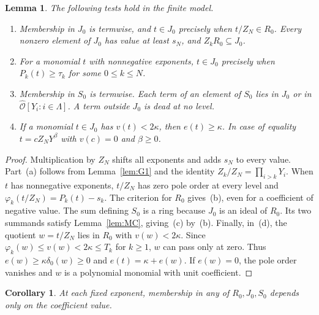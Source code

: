 \documentclass[11pt, letterpaper]{article}
\newtheorem{lemma}[theorem]{Lemma}
\newtheorem{corollary}[theorem]{Corollary}
\theoremstyle{definition}
\theoremstyle{remark}
\begin{document}
\begin{lemma}
    \label{lem:G2}
    The following tests hold in the finite model.
    \begin{enumerate}
        \item[\textup{(a)}] Membership in $J_{0}$ is termwise, and $t \in J_{0}$ precisely when $t/Z_{N} \in R_{0}$.
        Every nonzero element of $J_{0}$ has value at least $s_{N}$, and $Z_{k}R_{0} \subseteq J_{0}$.
        \item[\textup{(b)}] For a monomial $t$ with nonnegative exponents, $t \in J_{0}$ precisely when $P_{k}(t) \ge \tau_{k}$ for some $0 \le k \le N$.
        \item[\textup{(c)}] Membership in $S_{0}$ is termwise.
        Each term of an element of $S_{0}$ lies in $J_{0}$ or in $\widehat{\mathcal{O}}[Y_{i} : i \in \Lambda]$.
        A term outside $J_{0}$ is dead at no level.
        \item[\textup{(d)}] If a monomial $t \in J_{0}$ has $v(t) < 2\kappa$, then $e(t) \ge \kappa$.
        In case of equality $t = cZ_{N}Y^{\beta}$ with $v(c) = 0$ and $\beta \ge 0$.
    \end{enumerate}
\end{lemma}

\begin{proof}
    Multiplication by $Z_{N}$ shifts all exponents and adds $s_{N}$ to every value.
    Part~(a) follows from Lemma~\ref{lem:G1} and the identity $Z_{k}/Z_{N} = \prod_{i > k}Y_{i}$.
    When $t$ has nonnegative exponents, $t/Z_{N}$ has zero pole order at every level and $\varphi_{k}(t/Z_{N}) = P_{k}(t) - s_{k}$.
    The criterion for $R_{0}$ gives~(b), even for a coefficient of negative value.
    The sum defining $S_{0}$ is a ring because $J_{0}$ is an ideal of $R_{0}$.
    Its two summands satisfy Lemma~\ref{lem:MC}, giving~(c) by~(b).
    Finally, in~(d), the quotient $w = t/Z_{N}$ lies in $R_{0}$ with $v(w) < 2\kappa$.
    Since $\varphi_{k}(w) \le v(w) < 2\kappa \le T_{k}$ for $k \ge 1$, $w$ can pass only at zero.
    Thus $e(w) \ge \kappa\delta_{0}(w) \ge 0$ and $e(t) = \kappa + e(w)$.
    If $e(w) = 0$, the pole order vanishes and $w$ is a polynomial monomial with unit coefficient.
\end{proof}

\begin{corollary}
    \label{rem:membership}
    At each fixed exponent, membership in any of $R_{0}, J_{0}, S_{0}$ depends only on the coefficient value.
\end{corollary}
\end{document}
